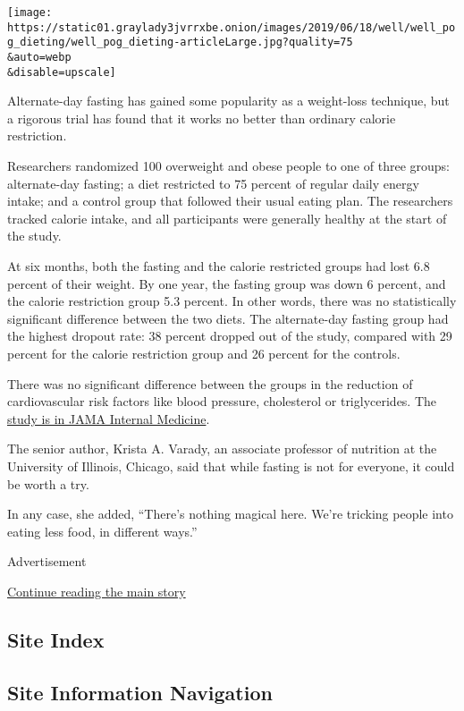 \texttt{[image: https://static01.graylady3jvrrxbe.onion/images/2019/06/18/well/well\_pog\_dieting/well\_pog\_dieting-articleLarge.jpg?quality=75\\\&auto=webp\\\&disable=upscale]}

Alternate-day fasting has gained some popularity as a weight-loss
technique, but a rigorous trial has found that it works no better than
ordinary calorie restriction.

Researchers randomized 100 overweight and obese people to one of three
groups: alternate-day fasting; a diet restricted to 75 percent of
regular daily energy intake; and a control group that followed their
usual eating plan. The researchers tracked calorie intake, and all
participants were generally healthy at the start of the study.

At six months, both the fasting and the calorie restricted groups had
lost 6.8 percent of their weight. By one year, the fasting group was
down 6 percent, and the calorie restriction group 5.3 percent. In other
words, there was no statistically significant difference between the two
diets. The alternate-day fasting group had the highest dropout rate: 38
percent dropped out of the study, compared with 29 percent for the
calorie restriction group and 26 percent for the controls.

There was no significant difference between the groups in the reduction
of cardiovascular risk factors like blood pressure, cholesterol or
triglycerides. The
\href{http://jamanetwork.com/journals/jamainternalmedicine/fullarticle/2623528}{study
is in JAMA Internal Medicine}.

The senior author, Krista A. Varady, an associate professor of nutrition
at the University of Illinois, Chicago, said that while fasting is not
for everyone, it could be worth a try.

In any case, she added, ``There's nothing magical here. We're tricking
people into eating less food, in different ways.''

Advertisement

\protect\hyperlink{after-bottom}{Continue reading the main story}

\hypertarget{site-index}{%
\subsection{Site Index}\label{site-index}}

\hypertarget{site-information-navigation}{%
\subsection{Site Information
Navigation}\label{site-information-navigation}}

